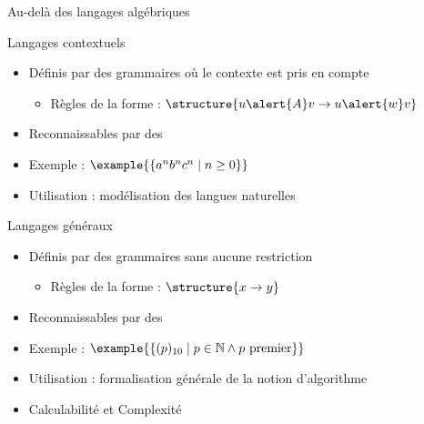 
\begingroup

\begin{frame}{Au-delà des langages algébriques}

  \begin{block}{Langages contextuels}
    \begin{itemize}
      \item Définis par des grammaires où le contexte est pris en compte
        \begin{itemize}
        \item Règles de la forme : $\structure{u \alert{A} v \rightarrow u \alert{w} v}$
        \end{itemize}
      \item Reconnaissables par des 
      \item Exemple : $\example{\{ a^n b^n c^n \mid n \geq 0 \}}$
      \item Utilisation : modélisation des langues naturelles
    \end{itemize}
  \end{block}

  \begin{block}{Langages généraux}
    \begin{itemize}
      \item Définis par des grammaires sans aucune restriction
        \begin{itemize}
        \item Règles de la forme : $\structure{x \rightarrow y}$
        \end{itemize}
      \item Reconnaissables par des 
      \item Exemple : $\example{\left\{ (p)_{10} \mid p\in \mathbb{N} \land p \text{ premier} \right\}}$
      \item Utilisation : formalisation générale de la notion d’algorithme
      \item {} \alert{Calculabilité et Complexité}
    \end{itemize}
  \end{block}

\end{frame}

\endgroup
